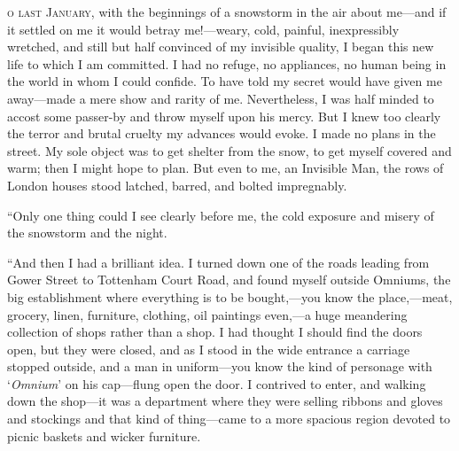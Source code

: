 \label{ch:22}
\begin{ChapterStart}
\vspace*{2\nbs}

\vspace{1.5\nbs}
\end{ChapterStart}

\kern-5pt\textsc{o last January,} with the beginnings of a snowstorm in the air about me—and if it settled on me it would betray me!—weary, cold, painful, inexpressibly wretched, and still but half convinced of my invisible quality, I began this new life to which I am committed. I had no refuge, no appliances, no human being in the world in whom I could confide. To have told my secret would have given me away—made a mere show and rarity of me. Nevertheless, I was half minded to accost some passer-by and throw myself upon his mercy. But I knew too clearly the terror and brutal cruelty my advances would evoke. I made no plans in the street. My sole object was to get shelter from the snow, to get myself covered and warm; then I might hope to plan. But even to me, an Invisible Man, the rows of London houses stood latched, barred, and bolted impregnably.

“Only one thing could I see clearly before me, the cold exposure and misery of the snowstorm and the night.

“And then I had a brilliant idea. I turned down one of the roads leading from Gower Street to Tottenham Court Road, and found myself outside Omniums, the big establishment where everything is to be bought,—you know the place,—meat, grocery, linen, furniture, clothing, oil paintings even,—a huge meandering collection of shops rather than a shop. I had thought I should find the doors open, but they were closed, and as I stood in the wide entrance a carriage stopped outside, and a man in uniform—you know the kind of personage with ‘\emph{Omnium}’ on his cap—flung open the door. I contrived to enter, and walking down the shop—it was a department where they were selling ribbons and gloves and stockings and that kind of thing—came to a more spacious region devoted to picnic baskets and wicker furniture.

